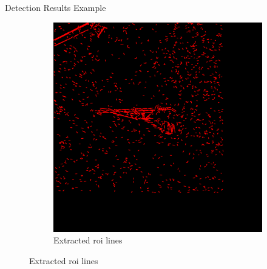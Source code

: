 \documentclass{beamer}
\begin{document}
\begin{frame}[t, fragile]{Detection Results Example}
\begin{figure}
\begin{subfigure}{.5\textwidth}
\includegraphics[scale=0.072]{pylon1}
\caption{Extracted roi lines}
\end{subfigure}
\end{figure}
\end{frame}
\end{document}
